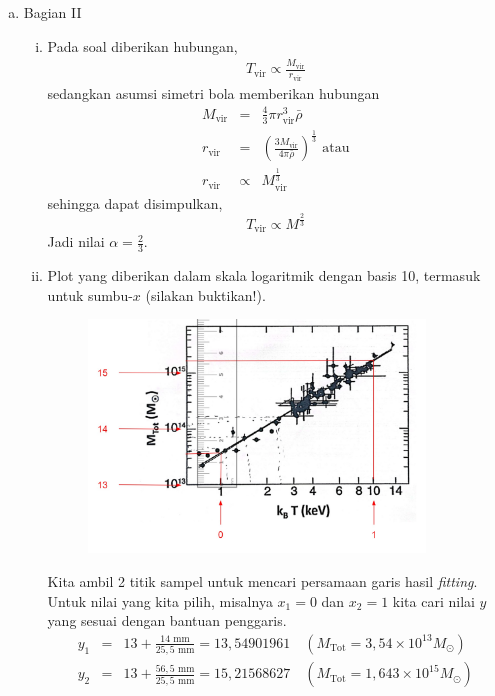 \documentclass[11pt,fleqn]{exam}
\begin{document}
\begin{questions}
\begin{enumerate}[a.]
    \item Bagian II
    \begin{enumerate}[i.]
        \item Pada soal diberikan hubungan,
        \begin{eqnarray*}
            T_\text{vir} \propto \frac{M_\text{vir}}{r_\text{vir}}
        \end{eqnarray*}
        sedangkan asumsi simetri bola memberikan hubungan
        \begin{eqnarray*}
            M_\text{vir} &=& \frac{4}{3} \pi r_\text{vir}^3 \bar{\rho}\\
            r_\text{vir} &=& \left(\frac{3 M_\text{vir}}{4 \pi \bar{\rho}}\right)^{\frac{1}{3}} \text{ atau}\\
            r_\text{vir} &\propto& M_\text{vir}^{\frac{1}{3}}
        \end{eqnarray*}
        sehingga dapat disimpulkan,
        \begin{equation*}
            T_\text{vir} \propto M^{\frac{2}{3}}
        \end{equation*}  
        Jadi nilai $\alpha = \frac{2}{3}$.

        \item Plot yang diberikan dalam skala logaritmik dengan basis 10, termasuk untuk sumbu-$x$ (silakan buktikan!).  
        \begin{figure}[!ht]
            \centering
            \includegraphics[width=0.9\textwidth]{osn_jwb5.jpg}
        \end{figure}

        Kita ambil 2 titik sampel untuk mencari persamaan garis hasil \textit{fitting}. Untuk nilai yang kita pilih, misalnya $x_1 = 0$ dan $x_2 = 1$ kita cari nilai $y$ yang sesuai dengan bantuan penggaris.
        \begin{eqnarray*}
            y_1 &=& 13 + \frac{14 \text{ mm}}{25,5 \text{ mm}} = 13,54901961 \quad (M_\text{Tot} = 3,54 \times 10^{13} M_\odot)\\
            y_2 &=& 13 + \frac{56,5 \text{ mm}}{25,5 \text{ mm}} = 15,21568627 \quad (M_\text{Tot} = 1,643 \times 10^{15} M_\odot)
        \end{eqnarray*}


\end{enumerate}
\end{enumerate}
\end{questions}
\end{document}
